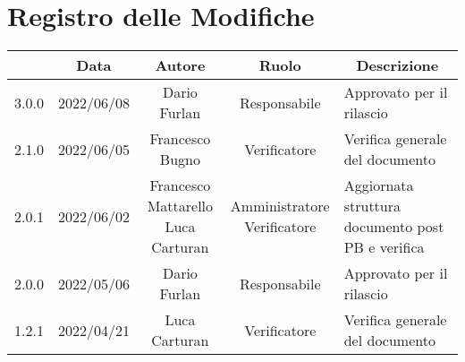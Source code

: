 \thispagestyle{empty}
\section*{Registro delle Modifiche}

\begin{center}
	\renewcommand{\arraystretch}{1.8}
	\begin{longtable}[c]{c | c | c | c | p{5cm}}
		\rowcolor[HTML]{125E28}
		\multicolumn{1}{c}{\color[HTML]{FFFFFF} \textbf{Versione}} &
		\multicolumn{1}{c}{\color[HTML]{FFFFFF} \textbf{Data}}     &
		\multicolumn{1}{c}{\color[HTML]{FFFFFF} \textbf{Autore}}   &
		\multicolumn{1}{c}{\color[HTML]{FFFFFF} \textbf{Ruolo}}    &
		\multicolumn{1}{c}{\color[HTML]{FFFFFF} \textbf{Descrizione}}                                                                                                                                                                                                               \\
		\endhead
		3.0.0                                                      & 2022/06/08 & Dario Furlan                         & Responsabile   & Approvato per il rilascio                                                                                                                 \\
		2.1.0                                                      & 2022/06/05 & Francesco Bugno                        & Verificatore   & Verifica generale del documento                                                                                                           \\
		2.0.1													   & 2022/06/02 & \Longunderstack{Francesco Mattarello                                                                                                                                                                   \\Luca Carturan} & \Longunderstack{Amministratore\\Verificatore} & Aggiornata struttura documento post PB e verifica\\
		2.0.0                                                      & 2022/05/06 & Dario Furlan                         & Responsabile   & Approvato per il rilascio                                                                                                                 \\
		1.2.1                                                      & 2022/04/21 & Luca Carturan                        & Verificatore   & Verifica generale del documento                                                                                                           \\

\end{longtable}
\end{center}
